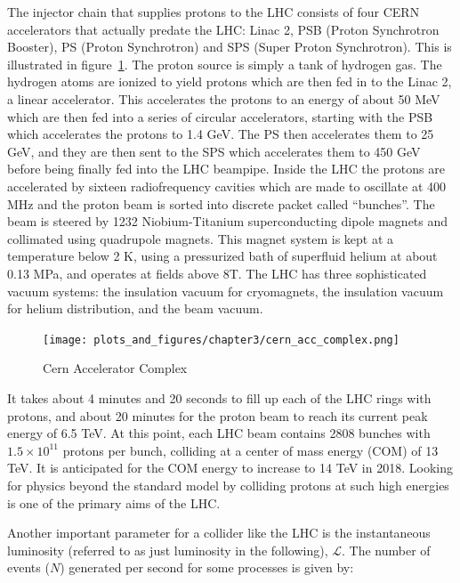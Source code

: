 The injector chain that supplies protons to the LHC consists of four CERN accelerators that actually predate the LHC: Linac 2, PSB (Proton Synchrotron Booster), PS (Proton Synchrotron) and SPS (Super Proton Synchrotron). This is illustrated in figure~\ref{fig:cern_acc_comp}. The proton source is simply a tank of hydrogen gas. The hydrogen atoms are ionized to yield protons which are then fed in to the Linac 2, a linear accelerator. This accelerates the protons to an energy of about 50 MeV which are then fed into a series of circular accelerators, starting with the PSB which accelerates the protons to 1.4 GeV. The PS then accelerates them to 25 GeV, and they are then sent to the SPS which accelerates them to 450 GeV before being finally fed into the LHC beampipe. Inside the LHC the protons are accelerated by sixteen radiofrequency cavities which are made to oscillate at 400 MHz and the proton beam is sorted into discrete packet called ``bunches''. The beam is steered by 1232 Niobium-Titanium superconducting dipole magnets and collimated using quadrupole magnets. This magnet system is kept at a temperature below 2 K, using a pressurized bath of superfluid helium at about 0.13 MPa, and operates at fields above 8T. The LHC has three sophisticated vacuum systems: the insulation vacuum for cryomagnets, the insulation vacuum for helium distribution, and the beam vacuum.

\begin{figure}
\begin{center}
\texttt{[image: plots\_and\_figures/chapter3/cern\_acc\_complex.png]}
\caption{Cern Accelerator Complex ~\cite{acc_complex}}
\label{fig:cern_acc_comp}
\end{center}
\end{figure}


It takes about 4 minutes and 20 seconds to fill up each of the LHC rings with protons, and about 20 minutes for the proton beam to reach its current peak energy of 6.5 TeV. At this point, each LHC beam contains 2808 bunches with $1.5 \times 10^{11}$ protons per bunch, colliding at a center of mass energy (COM) of 13 TeV. It is anticipated for the COM energy to increase to 14 TeV in 2018. Looking for physics beyond the standard model by colliding protons at such high energies is one of the primary aims of the LHC.

Another important parameter for a collider like the LHC is the instantaneous luminosity (referred to as just luminosity in the following), $\mathscr{L}$. The number of events ($N$) generated per second for some processes is given by:

